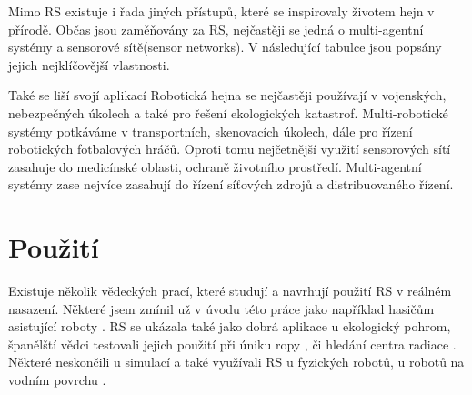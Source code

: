 \par 
Mimo RS existuje i řada jiných přístupů, které se inspirovaly životem hejn v přírodě. Občas jsou zaměňovány za RS, nejčastěji se jedná o multi-agentní systémy a sensorové sítě(sensor networks). V následující tabulce jsou popsány jejich nejklíčovější vlastnosti. 
\begin{center}
    \begin{table} 
    \end{table}
    \end{center}
    Také se liší svojí aplikací Robotická hejna se nejčastěji používají v vojenských, nebezpečných úkolech a také pro řešení ekologických katastrof. Multi-robotické systémy potkáváme v transportních, skenovacích úkolech, dále pro řízení robotických fotbalových hráčů. Oproti tomu nejčetnější využití sensorových sítí zasahuje do medicínské oblasti, ochraně životního prostředí. Multi-agentní systémy zase nejvíce zasahují do řízení síťových zdrojů a distribuovaného řízení. 
\section{Použití}
Existuje několik vědeckých prací, které studují a navrhují použití RS v reálném nasazení. Některé jsem zmínil už v úvodu této práce jako například hasičům asistující roboty \cite{fireRobots}. RS se ukázala také jako dobrá aplikace u ekologický pohrom, španělští vědci testovali jejich použití při úniku ropy \cite{oilSwarm}, či hledání centra radiace \cite{radiationSwarm}. Některé neskončili u simulací a také využívali RS u fyzických robotů, u robotů na vodním povrchu \cite{aquaticRobots}. \par

